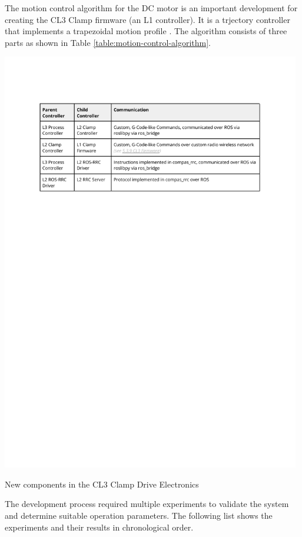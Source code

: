 The motion control algorithm for the DC motor is an important development for creating the CL3 Clamp firmware (an L1 controller). It is a trjectory controller that implements a trapezoidal motion profile . The algorithm consists of three parts as shown in Table
\ref{table:motion-control-algorithm}.

\begin{table}[h]
    \includegraphics[page=7, trim=25.4mm 195mm 25.4mm 33mm, clip, width=0.98\textwidth]{tables/Tables in Chapter 5.pdf}
    \caption{New components in the CL3 Clamp Drive Electronics}
    \label{table:motion-control-algorithm}
\end{table}

\FloatBarrier

The development process required multiple experiments to validate the system and determine suitable operation parameters. The following list shows the experiments and their results in chronological order.


